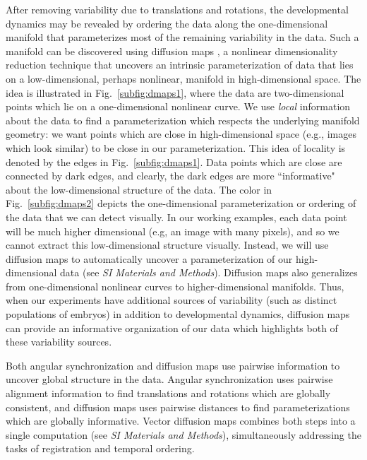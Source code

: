 \documentclass{pnastwo}
\newcommand{\SI}[0]{{\it SI Materials and Methods}}
\newcommand{\fig}[0]{Fig.}
\begin{document}
\begin{article}
%
After removing variability due to translations and rotations, the developmental dynamics may be revealed by ordering the data along the one-dimensional manifold that parameterizes most of the remaining variability in the data.
%
Such a manifold can be discovered using diffusion maps \cite{coifman2005geometric}, a nonlinear dimensionality reduction technique that uncovers an intrinsic parameterization of data that lies on a low-dimensional, perhaps nonlinear, manifold in high-dimensional space.
%
The idea is illustrated in \fig~\ref{subfig:dmaps1}, where the data are two-dimensional points which lie on a one-dimensional nonlinear curve.
%
We use {\it local} information about the data to find a parameterization which respects the underlying manifold geometry: we want points which are close in high-dimensional space (e.g., images which look similar) to be close in our parameterization.
%
This idea of locality is denoted by the edges in \fig~\ref{subfig:dmaps1}.
%
Data points which are close are connected by dark edges, and clearly, the dark edges are more ``informative" about the low-dimensional structure of the data.
%
The color in \fig~\ref{subfig:dmaps2} depicts the one-dimensional parameterization or ordering of the data that we can detect visually.
%
In our working examples, each data point will be much higher dimensional (e.g, an image with many pixels), and so we cannot extract this low-dimensional structure visually.
%
Instead, we will use diffusion maps to automatically uncover a parameterization of our high-dimensional data (see \SI).
%
Diffusion maps also generalizes from one-dimensional nonlinear curves to higher-dimensional manifolds.
%
Thus, when our experiments have additional sources of variability (such as distinct populations of embryos) in addition to developmental dynamics, diffusion maps can provide an informative organization of our data which highlights both of these variability sources.

Both angular synchronization and diffusion maps use pairwise information to uncover global structure in the data.
%
Angular synchronization uses pairwise alignment information to find translations and rotations which are globally consistent, and diffusion maps uses pairwise distances to find parameterizations which are globally informative.
%
Vector diffusion maps combines both steps into a single computation (see \SI), simultaneously addressing the tasks of registration and temporal ordering.
%
%
%


\end{article}
\end{document}
